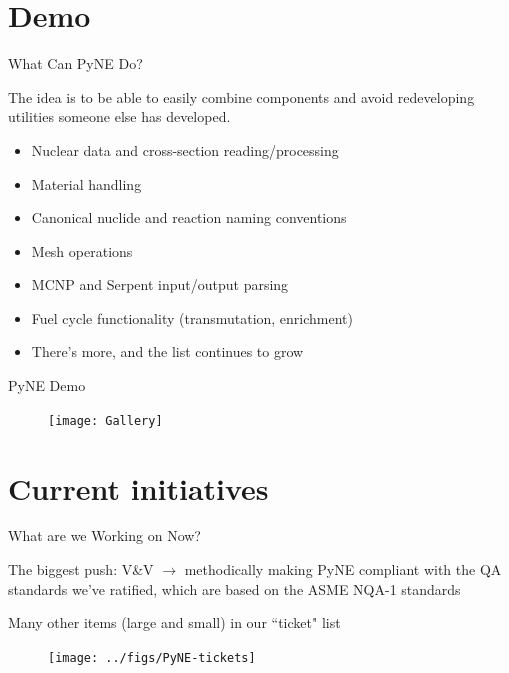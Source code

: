 \documentclass[xcolor=x11names,compress]{beamer}
\renewcommand{\(}{\begin{columns}}
\renewcommand{\)}{\end{columns}}
\newcommand{\<}[1]{\begin{column}{#1}}
\renewcommand{\>}{\end{column}}
\begin{document}
\section{Demo}
\begin{frame}{What Can PyNE Do?}

    The idea is to be able to easily combine components and avoid redeveloping
    utilities someone else has developed.

    \begin{itemize}
    \item Nuclear data and cross-section reading/processing
    \item Material handling
    \item Canonical nuclide and reaction naming conventions
    \item Mesh operations
    \item MCNP and Serpent input/output parsing
    \item Fuel cycle functionality (transmutation, enrichment)
    \item There's more, and the list continues to grow
    \end{itemize}
    
\end{frame}

\begin{frame}{PyNE Demo}
    
    \begin{center}
 	\begin{figure}
 	\texttt{[image: Gallery]}
    \end{figure}
 	\end{center}

\end{frame}

\section{Current initiatives}
\begin{frame}{What are we Working on Now?}

    The biggest push: \textcolor{dgreen}{V\&V} $\rightarrow$ methodically making PyNE compliant 
    with the QA standards we've ratified, which are based on the ASME NQA-1 standards
    \cite{pyne_vnv}

    \vspace*{1 em}
    Many other items (large and small) in our ``ticket" list
    
    \begin{center}
 	\begin{figure}
 	\texttt{[image: ../figs/PyNE-tickets]}
    \end{figure}
 	\end{center}
    
\end{frame}
\end{document}
